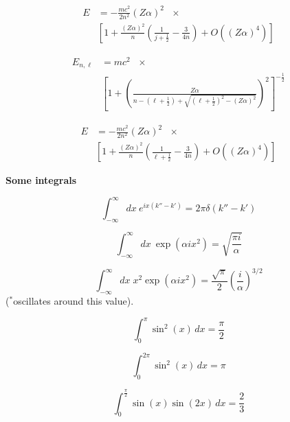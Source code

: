 \documentclass[11pt]{article}
\begin{document}
\begin{multicols}{2}
\begin{align}
  E & = - \frac{mc^2}{2n^2} (Z\alpha)^2 \:\:\: \times \nonumber \\
  & \left[ 1 + \frac{(Z\alpha)^2}{n}
  \left( \frac{1}{j+\frac{1}{2}} - \frac{3}{4n}
  \right)
  +O((Z\alpha)^4) \right]
\end{align}


\begin{align}
  E_{n,\ell} & = mc^2 \:\:\: \times \nonumber \\ 
    & \left[1 +
    \left(
    \frac{Z\alpha}{
      n - (\ell+\frac{1}{2}) + \sqrt{(\ell+\frac{1}{2})^2 - (Z\alpha)^2}
      }
    \right)^2
    \right]^{-\frac{1}{2}}
\end{align}

\begin{align}
  E & = - \frac{mc^2}{2n^2} (Z\alpha)^2 \:\:\: \times \nonumber \\
  & \left[ 1 + \frac{(Z\alpha)^2}{n}
  \left( \frac{1}{\ell+\frac{1}{2}} - \frac{3}{4n}
  \right)
  +O((Z\alpha)^4) \right]
\end{align}

{\bf Some integrals}

\begin{equation}
\int_{-\infty}^{\infty} dx \: e^{ix(k''-k')} = 2 \pi \delta (k''-k')
\end{equation}

\begin{equation}
\int_{-\infty}^{\infty} dx \: \exp (\alpha i x^2) = \sqrt{\frac{\pi i}{\alpha}}
\label{eq:simp_int}
\end{equation}

\begin{equation}
\int_{-\infty}^{\infty} dx \; x^2 \exp (\alpha i x^2) 
  = \frac{\sqrt{\pi}}{2} \left( \frac{i}{\alpha} \right)^{3/2}
\label{eq:2nd_simp_int}
\end{equation}
{\small ($^{*}$oscillates around this value)}.

\begin{equation}
\int_{0}^{\pi} \sin^{2}{\left (x \right )}\, dx  =  \frac{\pi}{2}
\end{equation}

\begin{equation}
\int_{0}^{2 \pi} \sin^{2}{\left (x \right )}\, dx  =  \pi
\end{equation}

\begin{equation}
\int_{0}^{\frac{\pi}{2}} \sin{\left (x \right )} \sin{\left (2 x \right )}\, dx  =  \frac{2}{3}
\end{equation}




\end{multicols}
\end{document}
